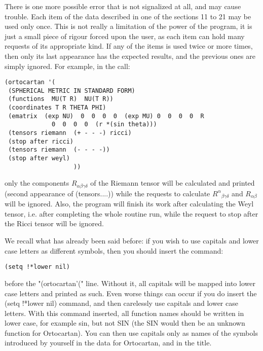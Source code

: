 There is one more possible error that is not signalized
     at all, and  may  cause  trouble.  Each  item  of  the  data
     described  in  one of the sections 11 to 21 may be used only
     once. This is not really a limitation of the power  of  the
     program,  it  is just a small piece of rigour forced upon the
     user, as each item can hold many requests of its appropriate
     kind. If any of the items is used twice or more times,  then
     only  its last appearance has the expected results, and the
     previous ones are simply ignored. For example, in the call:

\bigskip

\begin{verbatim}
(ortocartan '(
 (SPHERICAL METRIC IN STANDARD FORM)
 (functions  MU(T R)  NU(T R))
 (coordinates T R THETA PHI)
 (ematrix  (exp NU)  0  0  0  0  (exp MU) 0  0  0  0  R
             0  0  0  0  (r *(sin theta)))
 (tensors riemann  (+ - - -) ricci)
 (stop after ricci)
 (tensors riemann  (- - - -))
 (stop after weyl)
                   ))
\end{verbatim}

\bigskip

\noindent only the components $R_{\alpha \beta \gamma \delta}$ of  the Riemann
tensor will be calculated and printed (second appearance of  (tensors....))
while the requests to calculate ${R^{\alpha}}_{\beta \gamma \delta}$  and
$R_{\alpha \beta}$ will  be ignored. Also, the program will finish its work
after calculating the Weyl tensor, i.e. after completing the whole routine run,
while the request to stop after the  Ricci  tensor
     will be ignored.

We recall what has already been said before: if you wish to use capitals and
lower case letters as different symbols, then you should insert the command:

\bigskip

\begin{verbatim}
(setq !*lower nil)
\end{verbatim}

\bigskip

\noindent before the "(ortocartan'(" line. Without it, all capitals will be
mapped into lower case letters and printed as such. Even worse things can occur
if you do insert the (setq !*lower nil) command, and then carelessly use
capitals and lower case letters. With this command inserted, all function names
should be written in lower case, for example sin, but not SIN (the SIN would
then be an unknown function for Ortocartan). You can then use capitals only as
names of the symbols introduced by yourself in the data for Ortocartan, and in
the title.

